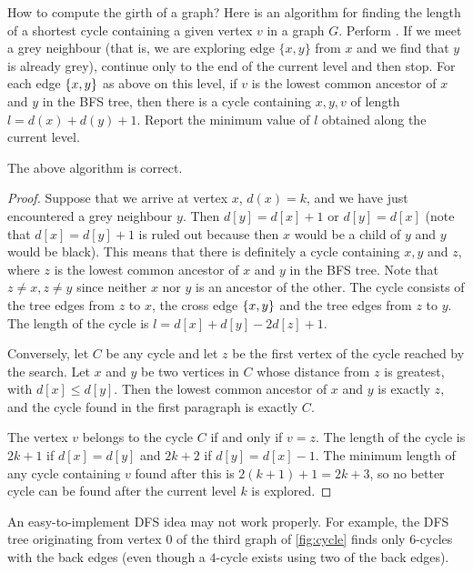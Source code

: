 How to compute the girth of a graph? Here is an algorithm for finding
the length of a shortest cycle containing a given vertex $v$ in a graph
$G$. Perform . If we meet a grey neighbour (that is,
we are exploring edge $\{x, y\}$ from $x$ and we find that $y$ is already
grey), continue only to the end of the current level and then stop. For
each edge $\mbox{$\{x, y\}$}$ as above on this level, if $v$ is the lowest
common ancestor of $x$ and $y$ in the BFS tree, then there is a cycle
containing $x, y, v$ of length $l=d(x) + d(y) + 1$. Report the minimum
value of $l$ obtained along the current level.

\begin{Theorem}
\label{thm:BFS-cycle} 
The above algorithm is correct.
\end{Theorem}

\begin{proof}
Suppose that we arrive at vertex $x$, $d(x) = k$, and we have just
encountered a grey neighbour $y$. Then $d[y] = d[x] + 1$ or $d[y] = d[x]$
(note that $d[x] = d[y] + 1$ is ruled out because then $x$ would be a
child of $y$ and $y$ would be black). This means that there is definitely
a cycle containing $x, y$ and $z$, where $z$ is the lowest common ancestor
of $x$ and $y$ in the BFS tree. Note that $z\neq x, z\neq y$ since neither
$x$ nor $y$ is an ancestor of the other. The cycle consists of the tree
edges from $z$ to $x$, the cross edge $\mbox{$\{x,y\}$}$ and the tree edges
from $z$ to $y$. The length of the cycle is $l=d[x] + d[y] - 2 d[z] + 1$.

Conversely, let $C$ be any cycle and let $z$ be the first vertex of
the cycle reached by the search. Let $x$ and $y$ be two vertices in $C$
whose distance  from $z$ is greatest, with $d[x] \leq d[y]$. Then the
lowest common ancestor of  $x$ and $y$ is exactly $z$, and the cycle
found in the first paragraph is exactly $C$.

The vertex $v$ belongs to the cycle $C$ if and only if $v = z$. The
length of the cycle is $2k+1$ if $d[x] = d[y]$ and $2k+2$ if $d[y] =
d[x] - 1$. The minimum length of any cycle containing $v$ found after
this is $2(k+1) + 1 = 2k+3$, so no better cycle can be found after the
current level $k$ is explored.
\end{proof}

\begin{note}
An easy-to-implement DFS idea may not work properly. For example,
the DFS tree originating from vertex $0$ of the third graph of
\cref{fig:cycle} finds only $6$-cycles with the back edges (even
though a $4$-cycle exists using two of the back edges).
\end{note}

